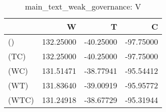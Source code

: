 \begin{table}
\centering
\caption{main_text_weak_governance: V}
\begin{tabular}{lrrr}
\toprule
{} &         W &         T &         C \\
\midrule
()    & 132.25000 & -40.25000 & -97.75000 \\
(TC)  & 132.25000 & -40.25000 & -97.75000 \\
(WC)  & 131.51471 & -38.77941 & -95.54412 \\
(WT)  & 131.83640 & -39.00919 & -95.95772 \\
(WTC) & 131.24918 & -38.67729 & -95.31944 \\
\bottomrule
\end{tabular}
\end{table}
